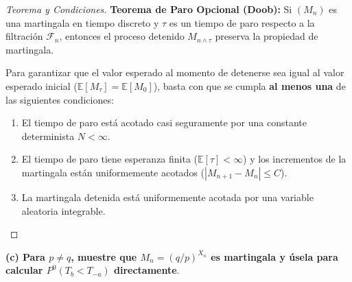 \documentclass[12pt, a4paper]{article}
\begin{document}
\begin{proof}[Teorema y Condiciones]
\textbf{Teorema de Paro Opcional (Doob):} Si $(M_n)$ es una martingala en tiempo discreto y $\tau$ es un tiempo de paro respecto a la filtración $\mathcal{F}_n$, entonces el proceso detenido $M_{n \wedge \tau}$ preserva la propiedad de martingala. 

Para garantizar que el valor esperado al momento de detenerse sea igual al valor esperado inicial ($\mathbb{E}[M_\tau] = \mathbb{E}[M_0]$), basta con que se cumpla \textbf{al menos una} de las siguientes condiciones:
\begin{enumerate}
    \item El tiempo de paro está acotado casi seguramente por una constante determinista $N < \infty$.
    \item El tiempo de paro tiene esperanza finita ($\mathbb{E}[\tau] < \infty$) y los incrementos de la martingala están uniformemente acotados ($|M_{n+1} - M_n| \le C$).
    \item La martingala detenida está uniformemente acotada por una variable aleatoria integrable.
\end{enumerate}
\end{proof}

\vspace{0.3cm}
\noindent \textbf{(c) Para $p \neq q$, muestre que $M_n = (q/p)^{X_n}$ es martingala y úsela para calcular $P^0(T_b < T_{-a})$ directamente}.
\end{document}
